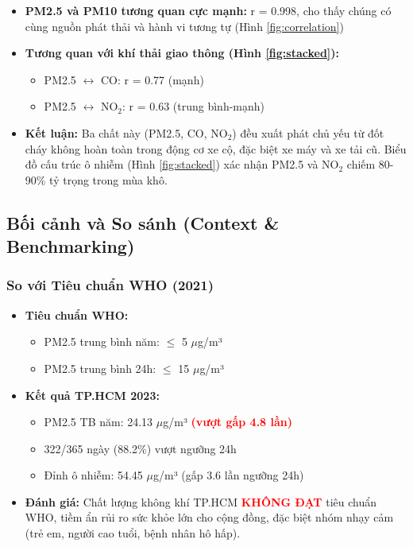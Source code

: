 \documentclass[12pt,a4paper]{article}
\begin{document}
\begin{itemize}
    \item \textbf{PM2.5 và PM10 tương quan cực mạnh:} r = 0.998, cho thấy chúng có cùng nguồn phát thải và hành vi tương tự (Hình \ref{fig:correlation})
    \item \textbf{Tương quan với khí thải giao thông (Hình \ref{fig:stacked}):}
    \begin{itemize}
        \item PM2.5 $\leftrightarrow$ CO: r = 0.77 (mạnh)
        \item PM2.5 $\leftrightarrow$ NO$_2$: r = 0.63 (trung bình-mạnh)
    \end{itemize}
    \item \textbf{Kết luận:} Ba chất này (PM2.5, CO, NO$_2$) đều xuất phát chủ yếu từ đốt cháy không hoàn toàn trong động cơ xe cộ, đặc biệt xe máy và xe tải cũ. Biểu đồ cấu trúc ô nhiễm (Hình \ref{fig:stacked}) xác nhận PM2.5 và NO$_2$ chiếm 80-90\% tỷ trọng trong mùa khô.
\end{itemize}

\subsection{Bối cảnh và So sánh (Context \& Benchmarking)}

\subsubsection{So với Tiêu chuẩn WHO (2021)}

\begin{itemize}
    \item \textbf{Tiêu chuẩn WHO:}
    \begin{itemize}
        \item PM2.5 trung bình năm: $\leq$ 5 $\mu$g/m³
        \item PM2.5 trung bình 24h: $\leq$ 15 $\mu$g/m³
    \end{itemize}
    
    \item \textbf{Kết quả TP.HCM 2023:}
    \begin{itemize}
        \item PM2.5 TB năm: 24.13 $\mu$g/m³ \textcolor{red}{\textbf{(vượt gấp 4.8 lần)}}
        \item 322/365 ngày (88.2\%) vượt ngưỡng 24h
        \item Đỉnh ô nhiễm: 54.45 $\mu$g/m³ (gấp 3.6 lần ngưỡng 24h)
    \end{itemize}
    
    \item \textbf{Đánh giá:} Chất lượng không khí TP.HCM \textcolor{red}{\textbf{KHÔNG ĐẠT}} tiêu chuẩn WHO, tiềm ẩn rủi ro sức khỏe lớn cho cộng đồng, đặc biệt nhóm nhạy cảm (trẻ em, người cao tuổi, bệnh nhân hô hấp).
\end{itemize}
\end{document}
